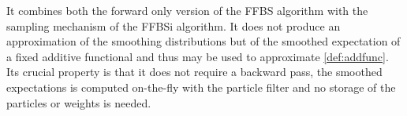 \documentclass[12pt]{article}
\newcommand{\1}{\mathrm{1}}
\begin{document}
It combines both the forward only version of the FFBS algorithm with the sampling mechanism of the FFBSi algorithm. It does not produce an approximation of the smoothing distributions but of the smoothed expectation of a fixed additive functional and thus  may be used to approximate \eqref{def:addfunc}. 
Its crucial property is that it does not require a backward pass, the smoothed expectations is computed on-the-fly with the particle filter and no storage of the particles or weights is needed. 
\end{document}
